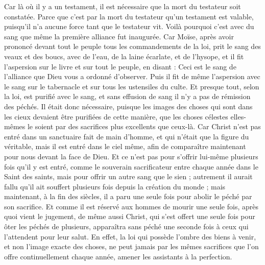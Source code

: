 \begin{multicols}{2}
Car là où il y a un testament, il est nécessaire que la mort du testateur soit constatée.
Parce que c'est par la mort du testateur qu'un testament est valable, puisqu’il n'a aucune force tant que le testateur vit.
Voilà pourquoi c’est avec du sang que même la première alliance fut inaugurée.
Car Moïse, après avoir prononcé devant tout le peuple tous les commandements de la loi, prit le sang des veaux et des boucs, avec de l'eau, de la laine écarlate, et de l'hysope, et il fit l’aspersion sur le livre et sur tout le peuple, en disant :
Ceci est le sang de l’alliance que Dieu vous a ordonné d'observer.
Puis il fit de même l’aspersion avec le sang sur le tabernacle et sur tous les ustensiles du culte.
Et presque tout, selon la loi, est purifié avec le sang, et sans effusion de sang il n’y a pas de rémission des péchés.
Il était donc nécessaire, puisque les images des choses qui sont dans les cieux devaient être purifiées de cette manière, que les choses célestes elles-mêmes le soient par des sacrifices plus excellents que ceux-là.
Car Christ n'est pas entré dans un sanctuaire fait de main d’homme, et qui n’était que la figure du véritable, mais il est entré dans le ciel même, afin de comparaître maintenant pour nous devant la face de Dieu.
Et ce n’est pas pour s’offrir lui-même plusieurs fois qu’il y est entré, comme le souverain sacrificateur entre chaque année dans le Saint des saints, mais pour offrir un autre sang que le sien ;
autrement il aurait fallu qu'il ait souffert plusieurs fois depuis la création du monde ; mais maintenant, à la fin des siècles, il a paru une seule fois pour abolir le péché par son sacrifice.
Et comme il est réservé aux hommes de mourir une seule fois, après quoi vient le jugement,
de même aussi Christ, qui s’est offert une seule fois pour ôter les péchés de plusieurs, apparaîtra sans péché une seconde fois à ceux qui l'attendent pour leur salut.
\VerseOne{}En effet, la loi qui possède l'ombre des biens à venir, et non l’image exacte des choses, ne peut jamais par les mêmes sacrifices que l'on offre continuellement chaque année, amener les assistants à la perfection.

\end{multicols}
